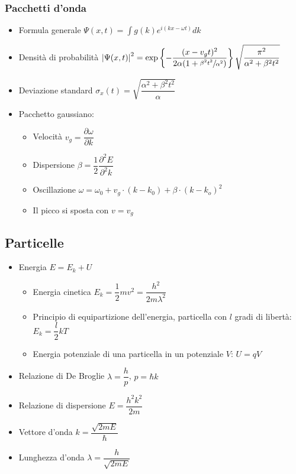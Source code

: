 \documentclass{article}
\begin{document}
\subsubsection{Pacchetti d'onda}
\begin{itemize}
  \item Formula generale \( \Psi(x, t) = \int{g(k) e^{i (kx- \omega t)} dk}  \)
  \item Densità di probabilità \( \left| \Psi(x, t) \right| ^ 2 = \exp\left\{-\dfrac{(x-v_g t) ^ 2}{2 \alpha (1 + \sfrac{\beta^2 t^2}{\alpha^2})}\right\} \sqrt{\dfrac{\pi^2}{\alpha^2 + \beta^2 t^2}} \)
  \item Deviazione standard \( \sigma_x (t) = \sqrt{ \dfrac{\alpha^2 + \beta^2 t^2}{\alpha} } \)
  \item Pacchetto gaussiano:
        \begin{itemize}
          \item Velocità \( v_g = \dfrac{\partial \omega}{\partial k} \)
          \item Dispersione \(\beta = \dfrac{1}{2} \dfrac{\partial ^ 2 E}{\partial ^ 2 k} \)
          \item Oscillazione \( \omega = \omega_0 + v_g \cdot (k - k_0) + \beta \cdot (k - k_o) ^ 2 \)
          \item Il picco si sposta con \( v = v_g \)
        \end{itemize}
\end{itemize}

\subsection{Particelle}
\begin{itemize}
  \item Energia \( E = E_k + U \)
        \begin{itemize}
          \item Energia cinetica \( E_k = \dfrac{1}{2} m v ^ 2 = \dfrac{h ^ 2}{2 m \lambda ^ 2 }\)
          \item Principio di equipartizione dell'energia, particella con \( l \) gradi di libertà: \( E_k = \dfrac{l}{2} k T \)
          \item Energia potenziale di una particella in un potenziale \( V \): \( U = qV \)
        \end{itemize}
  \item Relazione di De Broglie \( \lambda = \dfrac{h}{p} \), \( p = \hbar k \)
  \item Relazione di dispersione \( E = \dfrac{h ^ 2 k ^ 2}{2 m} \)
  \item Vettore d'onda \( \displaystyle k = \dfrac{\sqrt{2mE}}{\hbar} \)
  \item Lunghezza d'onda \( \displaystyle \lambda = \dfrac{h}{\sqrt{2mE}} \)
\end{itemize}
\end{document}
